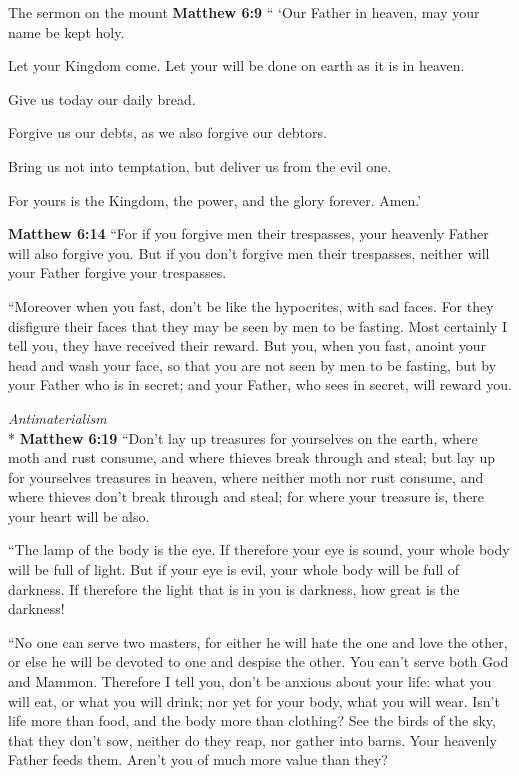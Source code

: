 \documentclass[10pt,twoside]{article} %
\newcommand{\doimage}[2]{\texttt{[image: \#2]}\label{fig:#2}}
\newcommand{\figbasic}[4]{ %
    \ifthenelse{\isodd{\pageref{fig:#2}}}{}{\hfill}
    \ifstrempty{#3}{
      \doimage{#1}{#2}
    }{
      \makebox{\doimage{#1}{#2} \\ #3}
    }
    \ifthenelse{\isodd{\pageref{fig:#2}}}{\hfill}{}
    \par
}
\newcommand{\fig}[2][0.4]{
  \figbasic{#1}{#2}{}{}
}
\newcommand{\quotesize}{\normalsize{}}
\newenvironment{quotetext}{\begingroup\quotesize}{\endgroup}
\newcommand{\intex}[1]{\index[texts]{#1}}
\newcommand{\bible}[2]{\begin{quotetext}\textbf{#1}\intex{#1} #2\end{quotetext}}
\newcommand{\matthew}[2]{\bible{Matthew #1}{#2}}
\newcommand{\subhead}[1]{\emph{#1}\\*}
\begin{document}
\begin{section}{The sermon on the mount}
\matthew{6:9}{
`` `Our Father in heaven, may your name be kept holy.

   Let your Kingdom come.
Let your will be done on earth as it is in heaven.

   Give us today our daily bread.

   Forgive us our debts,
as we also forgive our debtors.

   Bring us not into temptation,
but deliver us from the evil one.

For yours is the Kingdom, the power, and the glory forever. Amen.'
}

\matthew{6:14}{
   ``For if you forgive men their trespasses, your heavenly Father will also forgive you.    But if you don't forgive men their trespasses, neither will your Father forgive your trespasses.

   ``Moreover when you fast, don't be like the hypocrites, with sad faces. For they disfigure their faces that they may be seen by men to be fasting. Most certainly I tell you, they have received their reward.    But you, when you fast, anoint your head and wash your face,    so that you are not seen by men to be fasting, but by your Father who is in secret; and your Father, who sees in secret, will reward you.}

\fig{mammon}

\subhead{Antimaterialism}
\matthew{6:19}{
   ``Don't lay up treasures for yourselves on the earth, where moth and rust consume, and where thieves break through and steal;    but lay up for yourselves treasures in heaven, where neither moth nor rust consume, and where thieves don't break through and steal;    for where your treasure is, there your heart will be also.

   ``The lamp of the body is the eye. If therefore your eye is sound, your whole body will be full of light.    But if your eye is evil, your whole body will be full of darkness. If therefore the light that is in you is darkness, how great is the darkness!

   ``No one can serve two masters, for either he will hate the one and love the other, or else he will be devoted to one and despise the other. You can't serve both God and Mammon.    Therefore I tell you, don't be anxious about your life: what you will eat, or what you will drink; nor yet for your body, what you will wear. Isn't life more than food, and the body more than clothing?    See the birds of the sky, that they don't sow, neither do they reap, nor gather into barns. Your heavenly Father feeds them. Aren't you of much more value than they?

}
\end{section}
\end{document}
